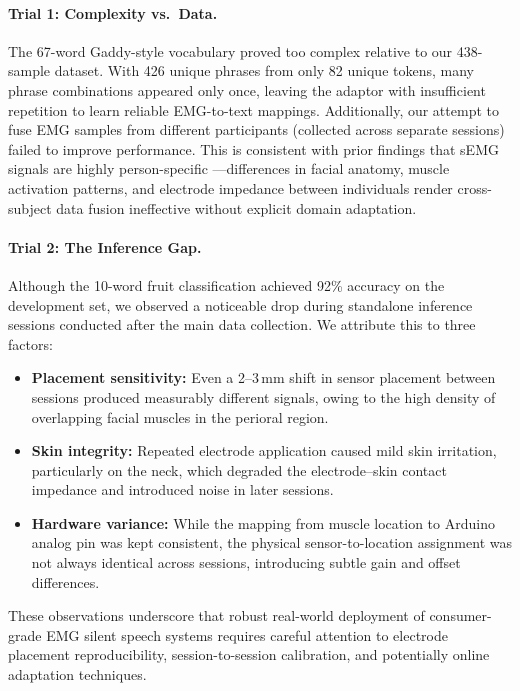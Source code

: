 \paragraph{Trial 1: Complexity vs.\ Data.} The 67-word Gaddy-style vocabulary proved too complex relative to our 438-sample dataset. With 426 unique phrases from only 82 unique tokens, many phrase combinations appeared only once, leaving the adaptor with insufficient repetition to learn reliable EMG-to-text mappings. Additionally, our attempt to fuse EMG samples from different participants (collected across separate sessions) failed to improve performance. This is consistent with prior findings that sEMG signals are highly person-specific \citep{mohapatra2025}---differences in facial anatomy, muscle activation patterns, and electrode impedance between individuals render cross-subject data fusion ineffective without explicit domain adaptation.

\paragraph{Trial 2: The Inference Gap.} Although the 10-word fruit classification achieved 92\% accuracy on the development set, we observed a noticeable drop during standalone inference sessions conducted after the main data collection. We attribute this to three factors:
\begin{itemize}
    \item \textbf{Placement sensitivity:} Even a 2--3\,mm shift in sensor placement between sessions produced measurably different signals, owing to the high density of overlapping facial muscles in the perioral region.
    \item \textbf{Skin integrity:} Repeated electrode application caused mild skin irritation, particularly on the neck, which degraded the electrode--skin contact impedance and introduced noise in later sessions.
    \item \textbf{Hardware variance:} While the mapping from muscle location to Arduino analog pin was kept consistent, the physical sensor-to-location assignment was not always identical across sessions, introducing subtle gain and offset differences.
\end{itemize}

These observations underscore that robust real-world deployment of consumer-grade EMG silent speech systems requires careful attention to electrode placement reproducibility, session-to-session calibration, and potentially online adaptation techniques.
